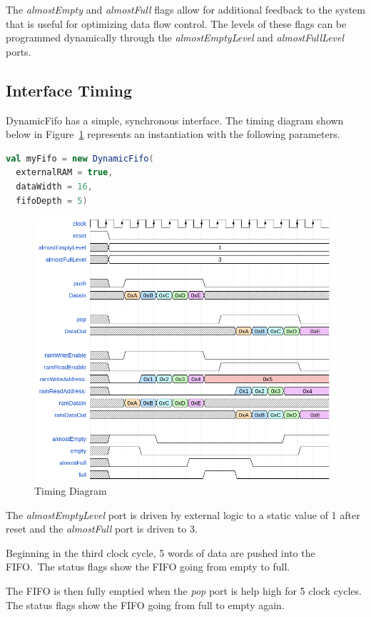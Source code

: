 The \textit{almostEmpty} and \textit{almostFull} flags allow for additional
feedback to the system that is useful for optimizing data flow control. The
levels of these flags can be programmed dynamically through the
\textit{almostEmptyLevel} and \textit{almostFullLevel} ports.

\newpage
\subsection{Interface Timing}

DynamicFifo has a simple, synchronous interface. The timing diagram shown below
in Figure~\ref{fig:timing} represents an instantiation with the following
parameters.

\begin{lstlisting}[language=Scala]
val myFifo = new DynamicFifo(
  externalRAM = true, 
  dataWidth = 16, 
  fifoDepth = 5) 
\end{lstlisting}

\begin{figure}[h]
  \includegraphics[width=\textwidth]{images/timing.png}
  \caption{Timing Diagram}\label{fig:timing}
\end{figure}

The \textit{almostEmptyLevel} port is driven by external logic to a static value
of 1 after reset and the \textit{almostFull} port is driven to 3.

Beginning in the third clock cycle, 5 words of data are pushed into the
FIFO.\ The status flags show the FIFO going from empty to full.

The FIFO is then fully emptied when the \textit{pop} port is help high for
5 clock cycles. The status flags show the FIFO going from full to empty again.